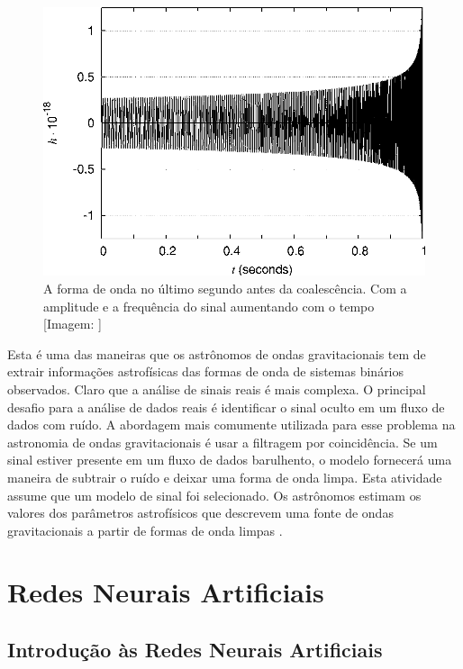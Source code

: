 \begin{figure}[ht]
\centering
\includegraphics[width=.9\textwidth]{figuras/metade.png}
\caption{A forma de onda no último segundo antes da coalescência. Com a amplitude e a frequência do sinal aumentando com o tempo [Imagem: \cite{rubbo2007hands}]}
\label{figmetade}
\end{figure}

Esta é uma das maneiras que os astrônomos de ondas gravitacionais tem de extrair informações astrofísicas das formas de onda de sistemas binários observados. Claro que a análise de sinais reais é mais complexa. O principal desafio para a análise de dados reais é identificar o sinal oculto em um fluxo de dados com ruído. A abordagem mais comumente utilizada para esse problema na astronomia de ondas gravitacionais é usar a filtragem por coincidência. Se um sinal estiver presente em um fluxo de dados barulhento, o modelo fornecerá uma maneira de subtrair o ruído e deixar uma forma de onda limpa. Esta atividade assume que um modelo de sinal foi selecionado. Os astrônomos estimam os valores dos parâmetros astrofísicos que descrevem uma fonte de ondas gravitacionais a partir de formas de onda limpas \cite{rubbo2007hands}. 







\section{Redes Neurais Artificiais}

\subsection{Introdução às Redes Neurais Artificiais}

